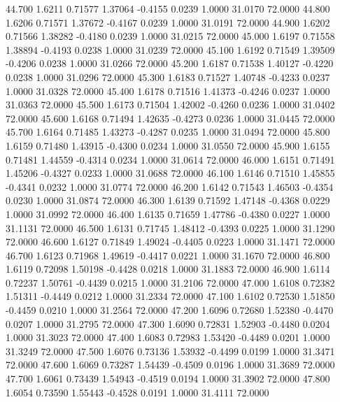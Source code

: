   44.700   1.6211   0.71577   1.37064  -0.4155   0.0239   1.0000  31.0170  72.0000
  44.800   1.6206   0.71571   1.37672  -0.4167   0.0239   1.0000  31.0191  72.0000
  44.900   1.6202   0.71566   1.38282  -0.4180   0.0239   1.0000  31.0215  72.0000
  45.000   1.6197   0.71558   1.38894  -0.4193   0.0238   1.0000  31.0239  72.0000
  45.100   1.6192   0.71549   1.39509  -0.4206   0.0238   1.0000  31.0266  72.0000
  45.200   1.6187   0.71538   1.40127  -0.4220   0.0238   1.0000  31.0296  72.0000
  45.300   1.6183   0.71527   1.40748  -0.4233   0.0237   1.0000  31.0328  72.0000
  45.400   1.6178   0.71516   1.41373  -0.4246   0.0237   1.0000  31.0363  72.0000
  45.500   1.6173   0.71504   1.42002  -0.4260   0.0236   1.0000  31.0402  72.0000
  45.600   1.6168   0.71494   1.42635  -0.4273   0.0236   1.0000  31.0445  72.0000
  45.700   1.6164   0.71485   1.43273  -0.4287   0.0235   1.0000  31.0494  72.0000
  45.800   1.6159   0.71480   1.43915  -0.4300   0.0234   1.0000  31.0550  72.0000
  45.900   1.6155   0.71481   1.44559  -0.4314   0.0234   1.0000  31.0614  72.0000
  46.000   1.6151   0.71491   1.45206  -0.4327   0.0233   1.0000  31.0688  72.0000
  46.100   1.6146   0.71510   1.45855  -0.4341   0.0232   1.0000  31.0774  72.0000
  46.200   1.6142   0.71543   1.46503  -0.4354   0.0230   1.0000  31.0874  72.0000
  46.300   1.6139   0.71592   1.47148  -0.4368   0.0229   1.0000  31.0992  72.0000
  46.400   1.6135   0.71659   1.47786  -0.4380   0.0227   1.0000  31.1131  72.0000
  46.500   1.6131   0.71745   1.48412  -0.4393   0.0225   1.0000  31.1290  72.0000
  46.600   1.6127   0.71849   1.49024  -0.4405   0.0223   1.0000  31.1471  72.0000
  46.700   1.6123   0.71968   1.49619  -0.4417   0.0221   1.0000  31.1670  72.0000
  46.800   1.6119   0.72098   1.50198  -0.4428   0.0218   1.0000  31.1883  72.0000
  46.900   1.6114   0.72237   1.50761  -0.4439   0.0215   1.0000  31.2106  72.0000
  47.000   1.6108   0.72382   1.51311  -0.4449   0.0212   1.0000  31.2334  72.0000
  47.100   1.6102   0.72530   1.51850  -0.4459   0.0210   1.0000  31.2564  72.0000
  47.200   1.6096   0.72680   1.52380  -0.4470   0.0207   1.0000  31.2795  72.0000
  47.300   1.6090   0.72831   1.52903  -0.4480   0.0204   1.0000  31.3023  72.0000
  47.400   1.6083   0.72983   1.53420  -0.4489   0.0201   1.0000  31.3249  72.0000
  47.500   1.6076   0.73136   1.53932  -0.4499   0.0199   1.0000  31.3471  72.0000
  47.600   1.6069   0.73287   1.54439  -0.4509   0.0196   1.0000  31.3689  72.0000
  47.700   1.6061   0.73439   1.54943  -0.4519   0.0194   1.0000  31.3902  72.0000
  47.800   1.6054   0.73590   1.55443  -0.4528   0.0191   1.0000  31.4111  72.0000

